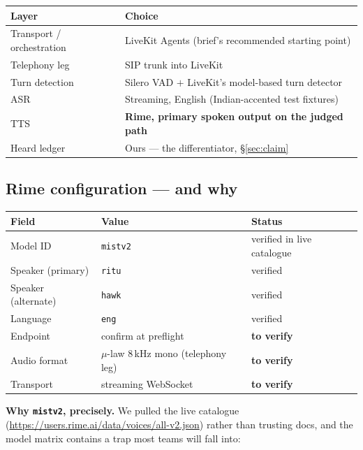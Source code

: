 \documentclass[11pt,a4paper]{article}
\newcommand{\code}[1]{\texttt{\small #1}}
\begin{document}
\begin{center}
\begin{tabular}{@{}ll@{}}
\toprule
\textbf{Layer} & \textbf{Choice} \\
\midrule
Transport / orchestration & LiveKit Agents (brief's recommended starting point) \\
Telephony leg & SIP trunk into LiveKit \\
Turn detection & Silero VAD $+$ LiveKit's model-based turn detector \\
ASR & Streaming, English (Indian-accented test fixtures) \\
TTS & \textbf{Rime, primary spoken output on the judged path} \\
Heard ledger & Ours --- the differentiator, \S\ref{sec:claim} \\
\bottomrule
\end{tabular}
\end{center}

\subsection{Rime configuration --- and why}

\begin{center}
\begin{tabular}{@{}lll@{}}
\toprule
\textbf{Field} & \textbf{Value} & \textbf{Status} \\
\midrule
Model ID & \code{mistv2} & verified in live catalogue \\
Speaker (primary) & \code{ritu} & verified \\
Speaker (alternate) & \code{hawk} & verified \\
Language & \code{eng} & verified \\
Endpoint & confirm at preflight & \textbf{to verify} \\
Audio format & $\mu$-law 8\,kHz mono (telephony leg) & \textbf{to verify} \\
Transport & streaming WebSocket & \textbf{to verify} \\
\bottomrule
\end{tabular}
\end{center}

\vspace{0.4em}
\textbf{Why \code{mistv2}, precisely.} We pulled the live catalogue
(\url{https://users.rime.ai/data/voices/all-v2.json}) rather than trusting docs, and the
model matrix contains a trap most teams will fall into:
\end{document}
